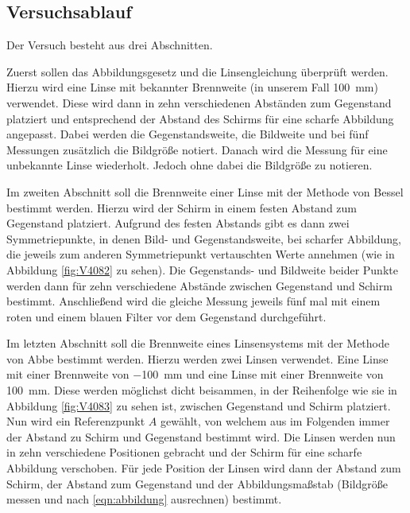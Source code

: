 \documentclass[
  bibliography=totoc,     %
  captions=tableheading,  %
  titlepage=firstiscover, %
]{scrartcl}
\begin{document}
\subsection{Versuchsablauf}
Der Versuch besteht aus drei Abschnitten.

\noindent
Zuerst sollen das Abbildungsgesetz und die Linsengleichung überprüft werden.
Hierzu wird eine Linse mit bekannter Brennweite (in unserem Fall \SI{100}{\milli\meter})
verwendet. Diese wird dann in zehn verschiedenen Abständen zum Gegenstand
platziert und entsprechend der Abstand des Schirms für eine scharfe Abbildung
angepasst. Dabei werden die Gegenstandsweite, die Bildweite und bei fünf
Messungen zusätzlich die Bildgröße notiert.
Danach wird die Messung für eine unbekannte Linse wiederholt. Jedoch ohne
dabei die Bildgröße zu notieren.

\noindent
Im zweiten Abschnitt soll die Brennweite einer Linse mit der Methode von
Bessel bestimmt werden. Hierzu wird der Schirm in einem festen Abstand
zum Gegenstand platziert. Aufgrund des festen Abstands gibt es dann zwei
Symmetriepunkte, in denen Bild- und Gegenstandsweite, bei scharfer
Abbildung, die jeweils zum anderen Symmetriepunkt vertauschten Werte
annehmen (wie in Abbildung \ref{fig:V4082} zu sehen). Die Gegenstands-
und Bildweite beider Punkte werden dann für zehn verschiedene Abstände
zwischen Gegenstand und Schirm bestimmt. Anschließend wird die gleiche
Messung jeweils fünf mal mit einem roten und einem blauen Filter vor
dem Gegenstand durchgeführt.

\noindent
Im letzten Abschnitt soll die Brennweite eines Linsensystems mit der Methode
von Abbe bestimmt werden. Hierzu werden zwei Linsen verwendet. Eine Linse
mit einer Brennweite von \SI{-100}{\milli\meter} und eine Linse mit einer
Brennweite von \SI{100}{\milli\meter}. Diese werden möglichst dicht beisammen,
in der Reihenfolge wie sie in Abbildung \ref{fig:V4083} zu sehen ist, zwischen
Gegenstand und Schirm platziert. Nun wird ein Referenzpunkt $A$ gewählt,
von welchem aus im Folgenden immer der Abstand zu Schirm und Gegenstand
bestimmt wird. Die Linsen werden nun in zehn verschiedene Positionen gebracht
und der Schirm für eine scharfe Abbildung verschoben.
Für jede Position der Linsen wird dann der Abstand zum Schirm, der Abstand zum
Gegenstand und der Abbildungsmaßstab (Bildgröße messen und nach \eqref{eqn:abbildung}
ausrechnen) bestimmt.
\end{document}
